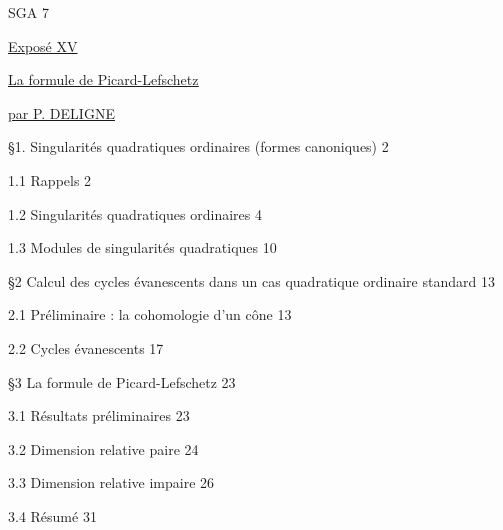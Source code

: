 


SGA 7


\underline{Exposé XV}


\underline{\underline{La formule de Picard-Lefschetz}}


\underline{par P. DELIGNE}

\S1. \hspace{1em} Singularités quadratiques ordinaires (formes canoniques) \hfill 2

\hspace*{2em}1.1 \hspace{0.5em} Rappels \hfill 2

\hspace*{2em}1.2 \hspace{0.5em} Singularités quadratiques ordinaires \hfill 4

\hspace*{2em}1.3 \hspace{0.5em} Modules de singularités quadratiques \hfill 10

\S2 \hspace{1em} Calcul des cycles évanescents dans un cas quadratique ordinaire standard \hfill 13

\hspace*{2em}2.1 \hspace{0.5em} Préliminaire : la cohomologie d'un cône \hfill 13

\hspace*{2em}2.2 \hspace{0.5em} Cycles évanescents \hfill 17

\S3 \hspace{1em} La formule de Picard-Lefschetz \hfill 23

\hspace*{2em}3.1 \hspace{0.5em} Résultats préliminaires \hfill 23

\hspace*{2em}3.2 \hspace{0.5em} Dimension relative paire \hfill 24

\hspace*{2em}3.3 \hspace{0.5em} Dimension relative impaire \hfill 26

\hspace*{2em}3.4 \hspace{0.5em} Résumé \hfill 31




